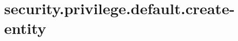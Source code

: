 \section{security.privilege.default.create-entity}
\label{configuration:SecurityPrivilegeDefaultCreateEntity}
\TODO
